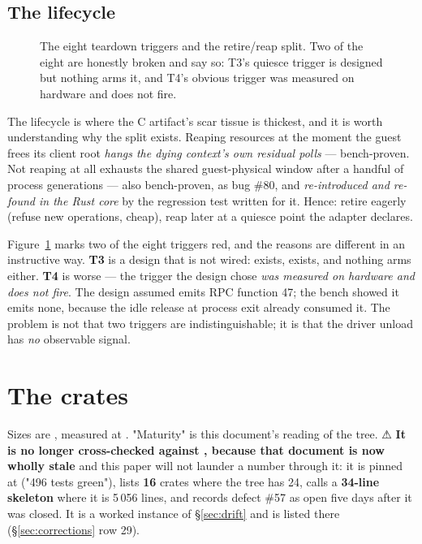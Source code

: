 \documentclass[10.5pt]{article}
\begin{document}
\subsection{The lifecycle}

\begin{landscape}\begin{figure}[p]
\centering
{}
\caption{The eight teardown triggers and the retire/reap split. Two of the eight are honestly
broken and say so: T3's quiesce trigger is designed but nothing arms it, and T4's obvious
trigger was measured on hardware and does not fire.}
\label{fig:lifecycle}
\end{figure}\end{landscape}

The lifecycle is where the C artifact's scar tissue is thickest, and it is worth understanding
why the split exists. Reaping resources at the moment the guest frees its client root
\emph{hangs the dying context's own residual polls} — bench-proven. Not reaping at all exhausts
the shared guest-physical window after a handful of process generations — also bench-proven, as
bug \#80, and \emph{re-introduced and re-found in the Rust core} by the regression test written
for it. Hence: retire eagerly (refuse new operations, cheap), reap later at a quiesce point the
adapter declares.

Figure~\ref{fig:lifecycle} marks two of the eight triggers red, and the reasons are different in
an instructive way. \textbf{T3} is a design that is not wired:  exists,
 exists, and nothing arms either. \textbf{T4} is worse
— the trigger the design chose \emph{was measured on hardware and does not fire}. The design
assumed  emits RPC function 47; the bench showed it emits none, because the idle
release at process exit already consumed it. The problem is not that two triggers are
indistinguishable; it is that the driver unload has \emph{no} observable signal.

\section{The crates}
\label{sec:crates}

Sizes are , measured at . "Maturity" is this
document's reading of the tree. ⚠ \textbf{It is no longer cross-checked against
, because that document is now wholly stale} and this
paper will not launder a number through it: it is pinned at  ("496 tests green"),
lists \textbf{16} crates where the tree has 24, calls  a \textbf{34-line
skeleton} where it is 5\,056 lines, and records defect \#57 as open five days after it was
closed. It is a worked instance of \S\ref{sec:drift} and is listed there
(\S\ref{sec:corrections} row 29).
\end{document}
